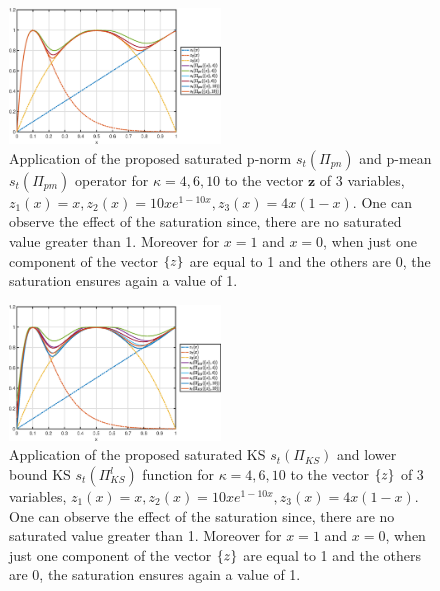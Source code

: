  \begin{figure}[!ht]
 \centering
  \includegraphics[width=0.5\textwidth]{images/Ch3/pmpnbenchsat.eps}
\caption{Application of the proposed saturated p-norm $s_t(\Pi_{pn})$ and p-mean $s_t(\Pi_{pm})$ operator for $\kappa=4,6,10$ to the vector $\mathbf{z}$ of 3 variables,$z_1(x)=x,z_2(x)=10xe^{1-10x},z_3(x)=4x(1-x)$. One can observe the effect of the saturation since, there are no saturated value greater than 1. Moreover for $x=1$ and $x=0$, when just one component of the vector  $\left\{{z}\right\}$ are equal to 1 and the others are 0, the saturation ensures again a value of 1.}
\label{fig:pbs}       %
\end{figure}
 \begin{figure}[!ht]
 \centering
  \includegraphics[width=0.5\textwidth]{images/Ch3/KSbenchsat.eps}
\caption{Application of the proposed saturated KS $s_t(\Pi_{KS})$ and lower bound KS $s_t(\Pi_{KS}^l)$ function for $\kappa=4,6,10$ to the vector $\left\{{z}\right\}$ of 3 variables, $z_1(x)=x,z_2(x)=10xe^{1-10x},z_3(x)=4x(1-x)$. One can observe the effect of the saturation since, there are no saturated value greater than 1. Moreover for $x=1$ and $x=0$, when just one component of the vector  $\left\{{z}\right\}$ are equal to 1 and the others are 0, the saturation ensures again a value of 1. }
\label{fig:kbs}       %
\end{figure}
